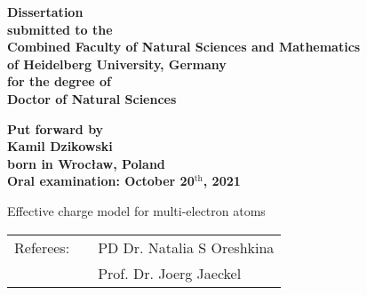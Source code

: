 \begin{titlepage}
\begin{center}
  \renewcommand{\baselinestretch}{1.50}
  {\bfseries
    Dissertation \\
    submitted to the \\
    Combined Faculty of Natural Sciences and Mathematics \\
    of Heidelberg University, Germany \\
    for the degree of \\
    Doctor of Natural Sciences
    \par
  }
  \vfill
  {\bfseries
    Put forward by \\
    \vspace{0.5\baselineskip}
    {\Large Kamil Dzikowski} \\
    \vspace{0.5\baselineskip}
    born in Wroc\l aw, Poland \\
    Oral examination: October 20$^{\textrm{th}}$, 2021
    \par
  }
\end{center}
\end{titlepage}

\begin{titlepage}
\begin{center}
  \renewcommand{\baselinestretch}{1.50}
  \vspace*{1.5\baselineskip}
  \bfseries
  {\huge \sffamily
  Effective charge model for multi-electron atoms
  \par}
  \vfill
  \large
  \begin{tabular}{lp{0.5cm}l}
  Referees: && PD Dr. Natalia S Oreshkina \\
            && Prof. Dr. Joerg Jaeckel
  \end{tabular}
\end{center}
\end{titlepage}

